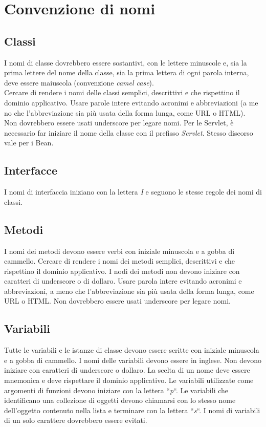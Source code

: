 \section{Convenzione di nomi}
\subsection{Classi}
I nomi di classe dovrebbero essere sostantivi, con le lettere minuscole e, sia la prima lettere del nome della classe, sia la prima lettera di ogni parola interna, deve essere maiuscola (convenzione \textit{camel case}).\\
Cercare di rendere i nomi delle classi semplici, descrittivi e che rispettino il dominio applicativo. Usare parole intere evitando acronimi e abbreviazioni (a me no che l'abbreviazione sia più usata della forma lunga, come URL o HTML).\\
Non dovrebbero essere usati underscore per legare nomi. Per le Servlet, è necessario far iniziare il nome della classe con il prefisso \textit{Servlet}. Stesso discorso vale per i Bean.
\subsection{Interfacce}
I nomi di interfaccia iniziano con la lettera \textit{I} e seguono le stesse regole dei nomi di classi.
\subsection{Metodi}
I nomi dei metodi devono essere verbi con iniziale minuscola e a gobba di cammello. Cercare di rendere i nomi dei metodi semplici, descrittivi e che rispettino il dominio applicativo. I nodi dei metodi non devono iniziare con caratteri di underscore o di dollaro. Usare parola intere evitando acronimi e abbreviazioni, a meno che l'abbreviazione sia più usata della forma lunga, come URL o HTML. Non dovrebbero essere usati underscore per legare nomi.
\subsection{Variabili}
Tutte le variabili e le istanze di classe devono essere scritte con iniziale minuscola e a gobba di cammello. I nomi delle variabili devono essere in inglese. Non devono iniziare con caratteri di underscore o dollaro. La scelta di un nome deve essere mnemonica e deve rispettare il dominio applicativo. Le variabili utilizzate come argomenti di funzioni devono iniziare con la lettera ``\textit{p}``. Le variabili che identificano una collezione di oggetti devono chiamarsi con lo stesso nome dell'oggetto contenuto nella lista e terminare con la lettera ``\textit{s}``. I nomi di variabili di un solo carattere dovrebbero essere evitati.
